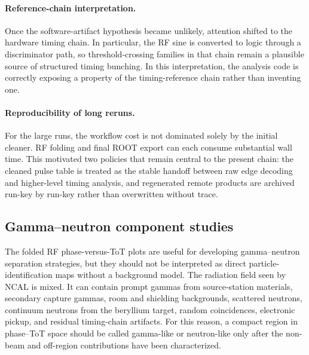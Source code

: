 \paragraph{Reference-chain interpretation.}
Once the software-artifact hypothesis became unlikely, attention shifted to the hardware timing chain. In particular, the RF sine is converted to logic through a discriminator path, so threshold-crossing families in that chain remain a plausible source of structured timing bunching. In this interpretation, the analysis code is correctly exposing a property of the timing-reference chain rather than inventing one.

\paragraph{Reproducibility of long reruns.}
For the large runs, the workflow cost is not dominated solely by the initial cleaner. RF folding and final ROOT export can each consume substantial wall time. This motivated two policies that remain central to the present chain: the cleaned pulse table is treated as the stable handoff between raw edge decoding and higher-level timing analysis, and regenerated remote products are archived run-key by run-key rather than overwritten without trace.

\subsection{Gamma--neutron component studies}

The folded RF phase-versus-ToT plots are useful for developing gamma--neutron separation strategies, but they should not be interpreted as direct particle-identification maps without a background model. The radiation field seen by NCAL is mixed. It can contain prompt gammas from source-station materials, secondary capture gammas, room and shielding backgrounds, scattered neutrons, continuum neutrons from the beryllium target, random coincidences, electronic pickup, and residual timing-chain artifacts. For this reason, a compact region in phase--ToT space should be called gamma-like or neutron-like only after the non-beam and off-region contributions have been characterized.

